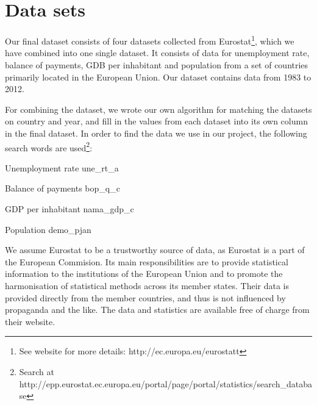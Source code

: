 \section{Data sets}
\label{DataSets}

Our final dataset consists of four datasets collected from Eurostat\footnote{See website for more details: http://ec.europa.eu/eurostatt}, which we have combined into one single dataset. It consists of data for unemployment rate, balance of payments, GDB per inhabitant and population from a set of countries primarily located in the European Union. Our dataset contains data from 1983 to 2012.

For combining the dataset, we wrote our own algorithm for matching the datasets on country and year, and fill in the values from each dataset into its own column in the final dataset. In order to find the data we use in our project, the following search words are used\footnote{Search at http://epp.eurostat.ec.europa.eu/portal/page/portal/statistics/search\_database}:

\begin{my_itemize}
\item{Unemployment rate} une\_rt\_a
\item{Balance of payments} bop\_q\_c
\item{GDP per inhabitant} nama\_gdp\_c
\item{Population} demo\_pjan
\end{my_itemize}

We assume Eurostat to be a trustworthy source of data, as Eurostat is a part of the European Commision. Its main responsibilities are to provide statistical information to the institutions of the European Union and to promote the harmonisation of statistical methods across its member states. Their data is provided directly from the member countries, and thus is not influenced by propaganda and the like. The data and statistics are available free of charge from their website.